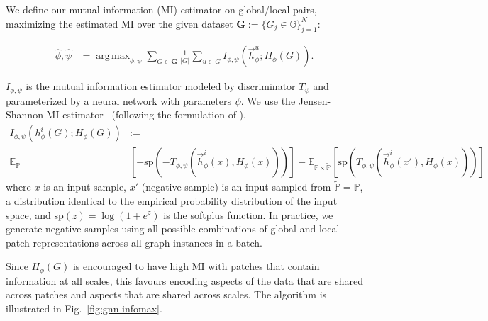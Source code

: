 \documentclass{article} \usepackage{iclr2020_conference,times}
\DeclareMathOperator*{\argmax}{arg\,max}
\newcommand{\PP}{\mathbb{P}}
\newcommand{\EE}{\mathbb{E}}
\begin{document}
We define our mutual information (MI) estimator on global/local pairs, maximizing the estimated MI over the given dataset $\mathbf{G} := \{G_j \in \mathbb{G}\}_{j=1}^N$:


\begin{align}
    \hat{\phi}, \hat{\psi}
    &= \argmax_{\phi, \psi} \sum_{G \in \mathbf{G}} \frac{1}{\left| G \right|} 
    \sum_{u \in G}
    I_{\phi,\psi}(\vec{h}_{\phi}^{u};H_{\phi}(G)).
    \label{eq:objective}
\end{align}

$I_{\phi,\psi}$ is the mutual information estimator modeled by discriminator $T_{\psi}$ and parameterized by a neural network with parameters $\psi$.
We use the Jensen-Shannon MI estimator
~(following the formulation of \cite{nowozin2016f}),
\begin{align}
 I_{\phi, \psi}(h_{\phi}^{i}(G); H_{\phi}(G)) &:=  \nonumber \\ 
 \EE_{\PP}&[-\text{sp}(-T_{\phi, \psi}(\vec{h}_{\phi}^{i}(x), H_{\phi}(x)))] 
    - \EE_{\PP \times \tilde{\PP}}[\text{sp}(T_{\phi, \psi}(\vec{h}_{\phi}^{i}(x'), H_{\phi}(x)))]
    \label{eq:objective1}
\end{align}
where $x$ is an input sample, $x'$ (negative sample) is an input sampled from $\tilde{\PP} = \PP$, a distribution identical to the empirical probability distribution of the input space, and $\text{sp}(z) = \log(1 + e^z)$ is the softplus function. In practice, we generate negative samples using all possible combinations of global and local patch representations across all graph instances in a batch.

Since $H_{\phi}(G)$ is encouraged to have high MI with patches that contain information at all scales, this favours encoding aspects of the data that are shared across patches and aspects that are shared across scales. The algorithm is illustrated in Fig.~\ref{fig:gnn-infomax}. 
\end{document}
